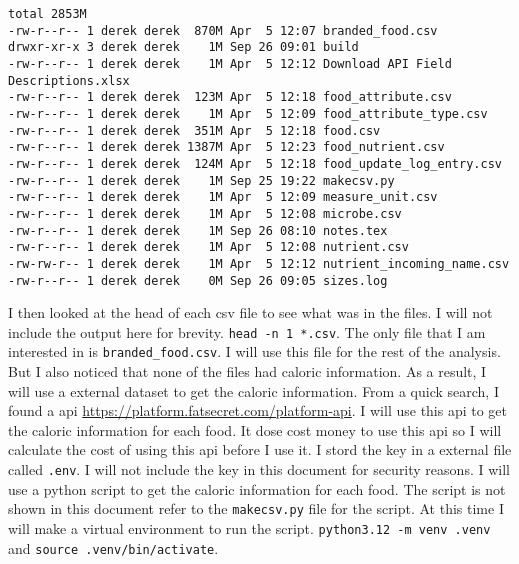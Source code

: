 \documentclass{article}
\begin{document}
\begin{lstlisting}[caption={list the files}, label={lst:list_files}]
total 2853M
-rw-r--r-- 1 derek derek  870M Apr  5 12:07 branded_food.csv
drwxr-xr-x 3 derek derek    1M Sep 26 09:01 build
-rw-r--r-- 1 derek derek    1M Apr  5 12:12 Download API Field Descriptions.xlsx
-rw-r--r-- 1 derek derek  123M Apr  5 12:18 food_attribute.csv
-rw-r--r-- 1 derek derek    1M Apr  5 12:09 food_attribute_type.csv
-rw-r--r-- 1 derek derek  351M Apr  5 12:18 food.csv
-rw-r--r-- 1 derek derek 1387M Apr  5 12:23 food_nutrient.csv
-rw-r--r-- 1 derek derek  124M Apr  5 12:18 food_update_log_entry.csv
-rw-r--r-- 1 derek derek    1M Sep 25 19:22 makecsv.py
-rw-r--r-- 1 derek derek    1M Apr  5 12:09 measure_unit.csv
-rw-r--r-- 1 derek derek    1M Apr  5 12:08 microbe.csv
-rw-r--r-- 1 derek derek    1M Sep 26 08:10 notes.tex
-rw-r--r-- 1 derek derek    1M Apr  5 12:08 nutrient.csv
-rw-rw-r-- 1 derek derek    1M Apr  5 12:12 nutrient_incoming_name.csv
-rw-r--r-- 1 derek derek    0M Sep 26 09:05 sizes.log
\end{lstlisting}
I then looked at the head of each csv file to see what was in the files. I will not include the output here for brevity. \texttt{head -n 1 *.csv}. The only file that I am interested in is \texttt{branded\_food.csv}. I will use this file for the rest of the analysis. But I also noticed that none of the files had caloric information. As a result, I will use a external dataset to get the caloric information. From a quick search, I found a api \url{https://platform.fatsecret.com/platform-api}. I will use this api to get the caloric information for each food. It dose cost money to use this api so I will calculate the cost of using this api before I use it. I stord the key in a external file called \texttt{.env}. I will not include the key in this document for security reasons. I will use a python script to get the caloric information for each food. The script is not shown in this document refer to the \texttt{makecsv.py} file for the script. At this time I will make a virtual environment to run the script. \texttt{python3.12 -m venv .venv} and \texttt{source .venv/bin/activate}.
\end{document}

